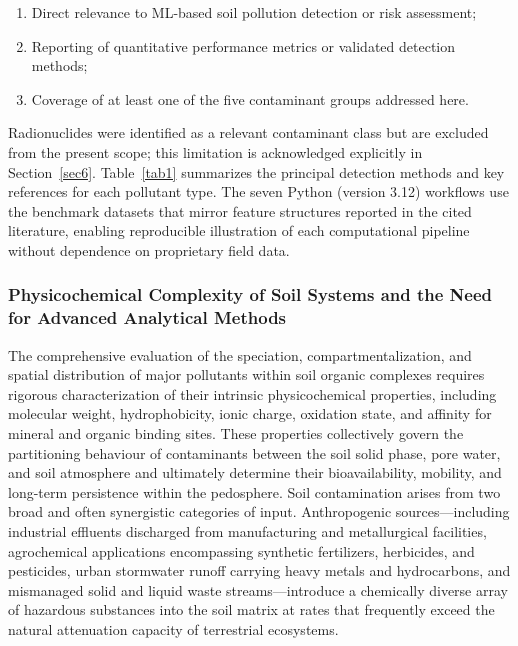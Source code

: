 \documentclass[environremediat,article,accept,pdftex,oneauthor]{Definitions/mdpi}
\begin{document}
\begin{enumerate}[label=(\roman*),leftmargin=7.5mm,labelsep=0.5mm,topsep=3pt]
    \item Direct relevance to ML-based soil pollution detection
        or risk assessment;
    \item Reporting of quantitative performance metrics or
        validated detection methods;
    \item Coverage of at least one of the five contaminant
        groups addressed here.
\end{enumerate}

Radionuclides were identified as a relevant contaminant class but are excluded from the
present scope; this limitation is acknowledged explicitly in
Section~\ref{sec6}. Table~\ref{tab1} summarizes the principal
detection methods and key references for each pollutant type. {The
seven Python (version 3.12) %
 workflows use the benchmark datasets that mirror
feature structures reported in the cited literature, enabling
reproducible illustration of each computational pipeline without
dependence on proprietary field data.}

\subsubsection{Physicochemical Complexity of Soil Systems and the
    Need for Advanced \linebreak Analytical Methods}\label{sec2.0.2}

The comprehensive evaluation of the speciation, compartmentalization,
and spatial distribution of major pollutants within soil organic
complexes requires rigorous characterization of their intrinsic
physicochemical properties, including molecular weight, hydrophobicity,
ionic charge, oxidation state, and affinity for mineral and organic
binding sites. {These properties collectively govern
the partitioning behaviour of contaminants between the soil solid
phase, pore water, and soil atmosphere and ultimately determine their
bioavailability, mobility, and long-term persistence within the
pedosphere. Soil contamination arises from two broad and often
synergistic categories of input.} Anthropogenic sources---including
industrial effluents discharged from manufacturing and metallurgical
facilities, agrochemical applications encompassing synthetic
fertilizers, herbicides, and pesticides, urban stormwater runoff
carrying heavy metals and hydrocarbons, and mismanaged solid and
liquid waste streams---introduce a chemically diverse array of
hazardous substances into the soil matrix at rates that frequently
exceed the natural attenuation capacity of terrestrial ecosystems.
\end{document}
